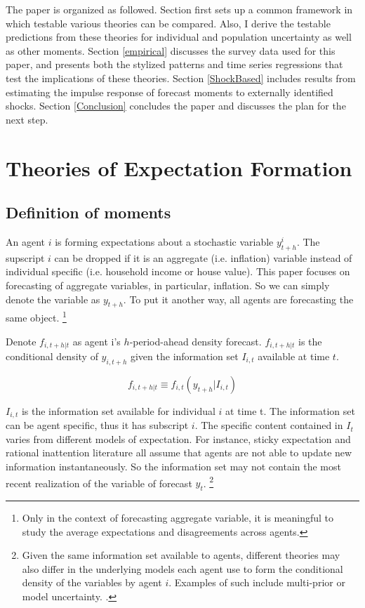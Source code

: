 \documentclass[]{article}
\begin{document}
	The paper is organized as followed. Section \label{theory} first sets up a common framework in which testable various theories can be compared. Also, I derive the testable predictions from these theories for individual and population uncertainty as well as other moments. Section \ref{empirical} discusses the survey data used for this paper, and presents both the stylized patterns and time series regressions that test the implications of these theories.   Section \ref{ShockBased} includes results from estimating the impulse response of forecast moments to externally identified shocks.  Section \ref{Conclusion} concludes the paper and discusses the plan for the next step. 
	
	\section{Theories of Expectation Formation}\label{theory}
	
	\subsection{Definition of moments}
	
	An agent $i$ is forming expectations about a stochastic variable $y^i_{t+h}$. The supscript $i$ can be dropped if it is an aggregate (i.e. inflation) variable instead of individual specific  (i.e. household income or house value). This paper focuses on forecasting of aggregate variables, in particular, inflation. So we can simply denote the variable as $y_{t+h}$. To put it another way, all agents are forecasting the same object. \footnote{Only in the context of forecasting aggregate variable, it is meaningful to study the average expectations and disagreements across agents.}
	
	Denote $ f_{i,t+h|t}$ as agent i's $h$-period-ahead density forecast. $ f_{i,t+h|t}$ is the conditional density of $y_{i,t+h}$ given the information set $I_{i,t}$ available at time $t$. 
	
	$$f_{i,t+h|t} \equiv f_{i,t}(y_{t+h}|I_{i,t})$$
	
	
	$I_{i,t}$ is the information set available for individual $i$ at time t. The information set can be  agent specific, thus it has subscript $i$.  The specific content contained in $I_t$ varies from different models of expectation. For instance, sticky expectation and rational inattention literature all assume that agents are not able to update new information instantaneously. So the information set may not contain the most recent realization of the variable of forecast $y_t$. \footnote{Given the same information set available to agents, different theories may also differ in the underlying models each agent use to form the conditional density of the variables by agent $i$. Examples of such include multi-prior or model uncertainty. \citet{xx}. }
	
\end{document}
